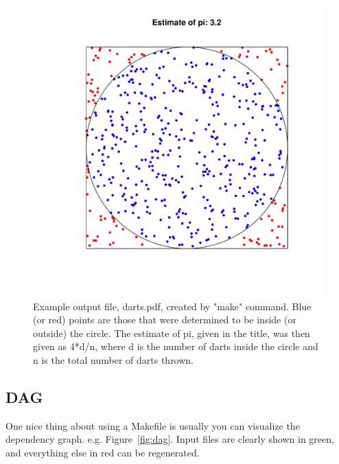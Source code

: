 \documentclass[12pt]{article}\usepackage[]{graphicx}\usepackage[]{color}
\begin{document}
\begin{figure}
  \centering
	\includegraphics{v1-R/darts.pdf}
  \caption{Example output file, darts.pdf, created by "make" command.
  Blue (or red) points are those that were determined to be inside (or
  outside) the circle.  The estimate of pi, given in the title, was
  then given as 4*d/n, where d is the number of darts inside the
  circle and n is the total number of darts thrown.}
  \label{fig:darts}
\end{figure}



\subsection{DAG}

One nice thing about using a Makefile is usually you can visualize the
dependency graph.  e.g.  Figure~\ref{fig:dag}.  Input files are
clearly shown in green, and everything else in red can be regenerated.
\end{document}
